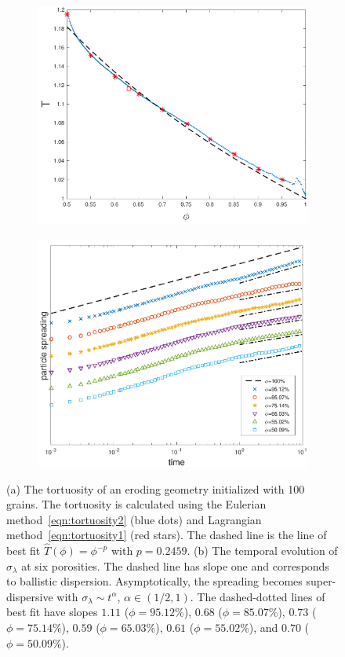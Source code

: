 \documentclass{jfm}
\begin{document}
\begin{figure}
\begin{subfigure}[b]{0.5\textwidth}
\includegraphics*[height = 0.8\linewidth]{./figs/tort_eulerian100}
\caption{}
\end{subfigure}
\begin{subfigure}[b]{0.5\textwidth}
\includegraphics*[height=0.8\linewidth]{./figs/100b_second_moment_long_ref}
\caption{}
\end{subfigure}
\caption{\label{fig:Eroding100Transport} (a) The tortuosity of an
eroding geometry initialized with 100 grains.  The tortuosity is
calculated using the Eulerian method~\eqref{eqn:tortuosity2} (blue dots)
and Lagrangian method~\eqref{eqn:tortuosity1} (red stars).  The dashed
line is the line of best fit $\widehat{T}(\phi)=\phi^{-p}$ with
$p=0.2459$. (b) The temporal evolution of $\sigma_\lambda$ at six
porosities.  The dashed line has slope one and corresponds to ballistic
dispersion. Asymptotically, the spreading becomes super-dispersive with
$\sigma_\lambda \sim t^{\alpha}$, $\alpha \in (1/2,1)$.  The
dashed-dotted lines of best fit have slopes $1.11$ ($\phi=95.12\%$),
$0.68$ ($\phi=85.07\%$), $0.73$ ($\phi=75.14\%$), $0.59$
($\phi=65.03\%$), $0.61$ ($\phi=55.02\%$), and $0.70$ ($\phi=50.09\%$).}
\end{figure}
\end{document}
